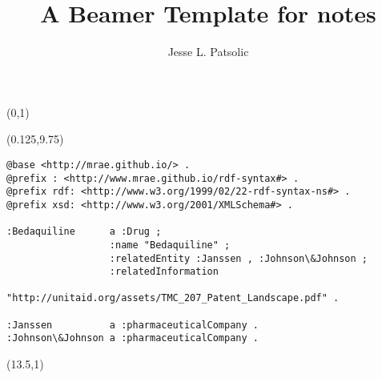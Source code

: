 \documentclass[xcolor=dvipsnames, aspectratio=169]{beamer}
\title[Daily Notes]{A Beamer Template for notes}
\subtitle[]{}
\author[JLP]{Jesse L. Patsolic}
\def\Title#1{\noindent{\large\textcolor{white}{\sf{#1}}}}
\newcommand\Mygrid{%
\tikz[
  remember picture,
  overlay,
  color=white,
  yscale=-1,
  xstep=\TPHorizModule,ystep=\TPVertModule,
  yshift=\TPVertModule,xshift=0pt]
  \draw (current page.north west) grid (current page.south east);}
\begin{document}
\begin{frame}[plain, fragile]

\begin{textblock}{5}(0,1)
\end{textblock}


\begin{textblock}{5}(0.125,9.75)
{\color{red}
\begin{lstlisting}[basicstyle=\tiny\ttfamily]
@base <http://mrae.github.io/> .
@prefix : <http://www.mrae.github.io/rdf-syntax#> .
@prefix rdf: <http://www.w3.org/1999/02/22-rdf-syntax-ns#> .
@prefix xsd: <http://www.w3.org/2001/XMLSchema#> .

:Bedaquiline      a :Drug ;
                  :name "Bedaquiline" ;
                  :relatedEntity :Janssen , :Johnson\&Johnson ;
                  :relatedInformation
                   "http://unitaid.org/assets/TMC_207_Patent_Landscape.pdf" .

:Janssen          a :pharmaceuticalCompany .
:Johnson\&Johnson a :pharmaceuticalCompany .
\end{lstlisting}
}
\end{textblock}

\begin{textblock}{3}(13.5,1)
	{\color{black!70}
	}
\end{textblock}


\end{frame}
\end{document}
